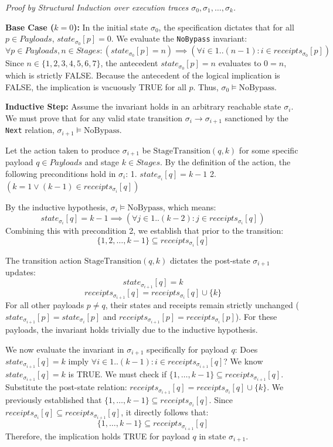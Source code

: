 \textit{Proof by Structural Induction over execution traces $\sigma_0, \sigma_1, \dots, \sigma_k$.}

\textbf{Base Case ($k=0$):} In the initial state $\sigma_0$, the specification dictates that for all $p \in Payloads$, $state_{\sigma_0}[p] = 0$. We evaluate the \texttt{NoBypass} invariant:
$$ \forall p \in Payloads, n \in Stages : (state_{\sigma_0}[p] = n) \implies (\forall i \in 1..(n-1) : i \in receipts_{\sigma_0}[p]) $$
Since $n \in \{1, 2, 3, 4, 5, 6, 7\}$, the antecedent $state_{\sigma_0}[p] = n$ evaluates to $0 = n$, which is strictly FALSE. Because the antecedent of the logical implication is FALSE, the implication is vacuously TRUE for all $p$. Thus, $\sigma_0 \models \text{NoBypass}$.

\textbf{Inductive Step:} Assume the invariant holds in an arbitrary reachable state $\sigma_i$. We must prove that for any valid state transition $\sigma_i \to \sigma_{i+1}$ sanctioned by the \texttt{Next} relation, $\sigma_{i+1} \models \text{NoBypass}$.

Let the action taken to produce $\sigma_{i+1}$ be $\text{StageTransition}(q, k)$ for some specific payload $q \in Payloads$ and stage $k \in Stages$.
By the definition of the action, the following preconditions hold in $\sigma_i$:
1. $state_{\sigma_i}[q] = k - 1$
2. $(k = 1 \lor (k-1) \in receipts_{\sigma_i}[q])$

By the inductive hypothesis, $\sigma_i \models \text{NoBypass}$, which means:
$$ state_{\sigma_i}[q] = k - 1 \implies (\forall j \in 1..(k-2) : j \in receipts_{\sigma_i}[q]) $$
Combining this with precondition 2, we establish that prior to the transition:
$$ \{1, 2, \dots, k-1\} \subseteq receipts_{\sigma_i}[q] $$

The transition action $\text{StageTransition}(q, k)$ dictates the post-state $\sigma_{i+1}$ updates:
$$ state_{\sigma_{i+1}}[q] = k $$
$$ receipts_{\sigma_{i+1}}[q] = receipts_{\sigma_i}[q] \cup \{k\} $$
For all other payloads $p \neq q$, their states and receipts remain strictly unchanged ($state_{\sigma_{i+1}}[p] = state_{\sigma_i}[p]$ and $receipts_{\sigma_{i+1}}[p] = receipts_{\sigma_i}[p]$). For these payloads, the invariant holds trivially due to the inductive hypothesis.

We now evaluate the invariant in $\sigma_{i+1}$ specifically for payload $q$:
Does $state_{\sigma_{i+1}}[q] = k$ imply $\forall i \in 1..(k-1) : i \in receipts_{\sigma_{i+1}}[q]$?
We know $state_{\sigma_{i+1}}[q] = k$ is TRUE.
We must check if $\{1, \dots, k-1\} \subseteq receipts_{\sigma_{i+1}}[q]$.
Substitute the post-state relation: $receipts_{\sigma_{i+1}}[q] = receipts_{\sigma_i}[q] \cup \{k\}$.
We previously established that $\{1, \dots, k-1\} \subseteq receipts_{\sigma_i}[q]$.
Since $receipts_{\sigma_i}[q] \subseteq receipts_{\sigma_{i+1}}[q]$, it directly follows that:
$$ \{1, \dots, k-1\} \subseteq receipts_{\sigma_{i+1}}[q] $$
Therefore, the implication holds TRUE for payload $q$ in state $\sigma_{i+1}$.

